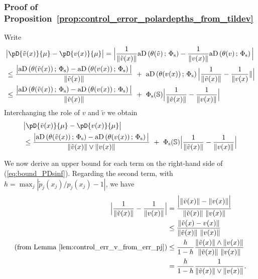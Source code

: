 \documentclass{article}
\numberwithin{equation}{section}
\newcommand{\sphere}{\mathbb{S}}
\newcommand{\mus}{\mu}%
\newcommand{\aD}[2]{{\mathrm{aD}}\left({#1}\,;\,{#2}\right)}
\newcommand{\Phitrad}{\Phi_{\mathrm{s}}} %
\begin{document}
\subsubsection{Proof of Proposition~\ref{prop:control_error_polardepths_from_tildev}}\label{subsubsec:A2}
    Write
    \begin{align}
        &  \big| \pD{\tilde v(x)}{\mus} - \pD{ v(x)}{\mus} \big|
        = \Big| \frac{1}{\|\tilde v(x)\|} \aD{ \theta(\tilde  v)}{ \Phitrad} -
        \frac{1}{\| v(x) \| } \aD{\theta( v)}{ \Phitrad}\Big| \nonumber \\
        & \le \frac{ \big|\aD{\theta(\tilde v(x)) }{\Phitrad} -
        \aD{ \theta(v(x)) }{\Phitrad} \big| }{
        \|\tilde v(x) \|}   ~+~
        \aD{ \theta(v(x)) }{\Phitrad} \Big|  \frac{1}{\|\tilde v(x) \| } -
        \frac{1}{\| v(x)} \|\Big| \nonumber \\
        &\le \frac{ \big|\aD{\theta(\tilde v(x)) }{\Phitrad} -
        \aD{ \theta(v(x)) }{\Phitrad} \big| }{
        \|\tilde v(x) \|}   ~+~
        \Phitrad(\sphere) \Big|  \frac{1}{\|\tilde v(x)  \|} -
        \frac{1}{\| v(x) \| } \Big| \nonumber
    \end{align}
    Interchanging the role of $v$ and $\tilde v$ we obtain
    \begin{equation}
        \label{eq:bound_PDsinf}
        \begin{aligned}
            &  \big| \pD{\tilde v(x)}{\mus} - \pD{ v(x)}{\mus} \big|  \\
            & \le   \frac{ \big|\aD{\theta(\tilde v(x)) }{\Phitrad} -
            \aD{ \theta(v(x)) }{\Phitrad} \big| }{
            \|\tilde v(x) \| \vee  \| v(x) \| }  ~+~
            \Phitrad(\sphere) \Big|  \frac{1}{\|\tilde v(x)  \|} -
            \frac{1}{\| v(x) \| } \Big|
        \end{aligned}
    \end{equation}

    We now derive an upper bound for each term on the right-hand side
    of (\ref{eq:bound_PDsinf}). Regarding the second term, with $h =
    \max_j|\tilde p_j(x_j)/p_j(x_j) - 1|$, we have
    \begin{align}
        \Big|  \frac{1}{\|\tilde v(x)  \|} -
        \frac{1}{\| v(x) \| } \Big|
        & = \frac{\Big| \|\tilde v(x)  \| - \| v(x)  \|\Big|
        }{\|\tilde v(x)  \|~\| v(x)  \|} \nonumber \\
        & \le  \frac{ \|\tilde v(x) -  v(x)  \|  }{\|\tilde v(x)
        \|~\| v(x)  \|} \nonumber \\
        \text{(from Lemma~\ref{lem:control_err_v_from_err_pj})}
        & \le \frac{h}{1-h}\frac{ \|\tilde v(x)  \| \wedge \| v(x)  \| }{
        \|\tilde v(x)  \| ~\| v(x)  \|} \nonumber \\
        & = \frac{h}{1-h}\frac{1}{
        \|\tilde v(x)  \| \vee \| v(x)  \|}\label{eq:control_1_over_tildev}.
    \end{align}
\end{document}
